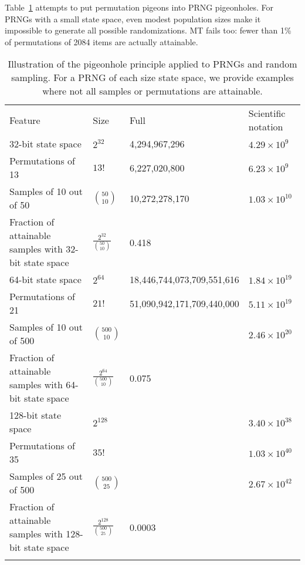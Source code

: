 \documentclass[graybox]{svmult}
\begin{document}
Table~\ref{tab:pigeonhole} attempts to put permutation pigeons into PRNG pigeonholes.
For PRNGs with a small state space, even modest population sizes make it impossible to generate all possible randomizations.
MT fails too: fewer than 1\% of permutations of 2084 items are actually attainable.

\begin{table}
\caption{Illustration of the pigeonhole principle applied to PRNGs and random sampling. For a PRNG of each size state space, we 
provide examples where not all samples or permutations are attainable.}
\label{tab:pigeonhole}       
\begin{tabular}[h]{p{4cm}p{2.4cm}p{4cm}p{2cm}}
\hline\noalign{\smallskip}
Feature & Size & Full & Scientific notation  \\
\noalign{\smallskip}\svhline\noalign{\smallskip}
32-bit state space & $2^{32}$ & 4,294,967,296 & $4.29 \times 10^9$ \\
Permutations of 13 & $13!$ & 6,227,020,800 & $6.23 \times 10^9$ \\
Samples of 10 out of 50 & ${50 \choose 10}$ &  10,272,278,170 & $1.03\times 10^{10} $ \\
Fraction of attainable samples with 32-bit state space & $\frac{2^{32}}{{50 \choose 10}}$   & 0.418 & \\
\noalign{\smallskip}\svhline\noalign{\smallskip}
64-bit state space & $2^{64}$ & 18,446,744,073,709,551,616 & $1.84 \times 10^{19}$ \\
Permutations of 21 & $21!$ &  51,090,942,171,709,440,000 & $5.11 \times 10^{19}$ \\
Samples of 10 out of 500 & ${500 \choose 10}$ & & $2.46 \times 10^{20}$ \\
Fraction of attainable samples with 64-bit state space & $\frac{2^{64}}{{500 \choose 10}}$ &  0.075 & \\
\noalign{\smallskip}\svhline\noalign{\smallskip}
128-bit state space & $2^{128}$ &  & $3.40 \times 10^{38}$ \\
Permutations of 35 & $35!$ &   & $1.03 \times 10^{40}$ \\
Samples of 25 out of 500 & ${500 \choose 25}$ & & $2.67 \times 10^{42}$ \\
Fraction of attainable samples with 128-bit state space & $\frac{2^{128}}{{500 \choose 25}}$ &  0.0003 & \\
\noalign{\smallskip}\svhline\noalign{\smallskip}

\end{tabular}
\end{table}
\end{document}
